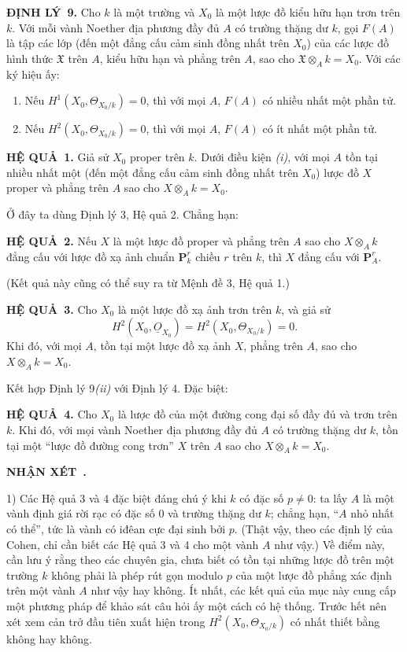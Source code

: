\documentclass[11pt,twoside,openany]{book}
\numberwithin{equation}{section}
\newcommand{\src}[1]{%
  \phantomsection\hypertarget{src:\fgasourceid:#1}{}%
  \marginpar{\raggedleft\footnotesize\sffamily #1}%
}
\newcommand{\fgasourceid}{unset}
\newcommand{\Osh}{\underline{O}}
\newcommand{\result}[2]{\par\medskip\noindent\textbf{#1\if\relax\detokenize{#2}\relax\else\ #2\fi.}\quad}
\begin{document}
\result{ĐỊNH LÝ}{9} Cho $k$ là một trường và $X_0$ là một lược đồ kiểu hữu
hạn trơn trên $k$. Với mỗi vành Noether địa phương đầy đủ $A$ có trường thặng
dư $k$, gọi $F(A)$ là tập các lớp (đến một đẳng cấu cảm sinh đồng nhất trên
$X_0$) của các lược đồ hình thức $\mathfrak X$ trên $A$, kiểu hữu hạn và phẳng
trên $A$, sao cho $\mathfrak X\otimes_A k=X_0$. Với các ký hiệu ấy:
\begin{enumerate}
  \item[\textit{i.}] Nếu $H^1(X_0,\Theta_{X_0/k})=0$, thì với mọi $A$,
    $F(A)$ có nhiều nhất một phần tử.
  \item[\textit{ii.}] Nếu $H^2(X_0,\Theta_{X_0/k})=0$, thì với mọi $A$,
    $F(A)$ có ít nhất một phần tử.
\end{enumerate}

\src{206}
\result{HỆ QUẢ}{1} Giả sử $X_0$ proper trên $k$. Dưới điều kiện
\textit{(i)}, với mọi $A$ tồn tại nhiều nhất một (đến một đẳng cấu cảm sinh
đồng nhất trên $X_0$) lược đồ $X$ proper và phẳng trên $A$ sao cho
$X\otimes_A k=X_0$.

Ở đây ta dùng Định lý 3, Hệ quả 2. Chẳng hạn:

\result{HỆ QUẢ}{2} Nếu $X$ là một lược đồ proper và phẳng trên $A$ sao cho
$X\otimes_A k$ đẳng cấu với lược đồ xạ ảnh chuẩn $\mathbf P_k^r$ chiều $r$
trên $k$, thì $X$ đẳng cấu với $\mathbf P_A^r$.

(Kết quả này cũng có thể suy ra từ Mệnh đề 3, Hệ quả 1.)

\result{HỆ QUẢ}{3} Cho $X_0$ là một lược đồ xạ ảnh trơn trên $k$, và giả sử
\[
  H^2(X_0,\Osh_{X_0})=H^2(X_0,\Theta_{X_0/k})=0.
\]
Khi đó, với mọi $A$, tồn tại một lược đồ xạ ảnh $X$, phẳng trên $A$, sao cho
$X\otimes_A k=X_0$.

Kết hợp Định lý 9\textit{(ii)} với Định lý 4. Đặc biệt:

\result{HỆ QUẢ}{4} Cho $X_0$ là lược đồ của một đường cong đại số đầy đủ và
trơn trên $k$. Khi đó, với mọi vành Noether địa phương đầy đủ $A$ có trường
thặng dư $k$, tồn tại một “lược đồ đường cong trơn” $X$ trên $A$ sao cho
$X\otimes_A k=X_0$.

\result{NHẬN XÉT}{}

1) Các Hệ quả 3 và 4 đặc biệt đáng chú ý khi $k$ có đặc số $p\ne0$: ta lấy
$A$ là một vành định giá rời rạc có đặc số $0$ và trường thặng dư $k$; chẳng
hạn, “$A$ nhỏ nhất có thể”, tức là vành có iđêan cực đại sinh bởi $p$. (Thật
vậy, theo các định lý của Cohen, chỉ cần biết các Hệ quả 3 và 4 cho một vành
$A$ như vậy.) Về điểm này, cần lưu ý rằng theo các chuyên gia, chưa biết có
tồn tại những lược đồ trên một trường $k$ không phải là phép rút gọn modulo
$p$ của một lược đồ phẳng xác định trên một vành $A$ như vậy hay không. Ít
nhất, các kết quả của mục này cung cấp một phương pháp để khảo sát câu hỏi ấy
một cách có hệ thống. Trước hết nên xét xem cản trở đầu tiên xuất hiện trong
$H^2(X_0,\Theta_{X_0/k})$ có nhất thiết bằng không hay không.
\end{document}
